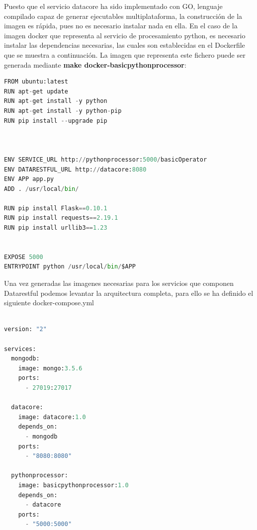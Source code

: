 \documentclass[a4paper,11pt]{book}
\begin{document}
Puesto que el servicio datacore ha sido implementado con GO, lenguaje compilado capaz de generar ejecutables multiplataforma, la construcción de la imagen es rápida, pues no es necesario instalar nada en ella. En el caso de la imagen docker que representa al servicio de procesamiento python, es necesario instalar las dependencias  necesarias, las cuales son establecidas en el Dockerfile que se muestra a continuación. La imagen que representa este fichero puede ser generada mediante \textbf{make docker-basicpythonprocessor}:

\begin{lstlisting}[language=python,caption={basicPythonProcessor/Dockerfile}]
FROM ubuntu:latest
RUN apt-get update
RUN apt-get install -y python
RUN apt-get install -y python-pip
RUN pip install --upgrade pip



ENV SERVICE_URL http://pythonprocessor:5000/basicOperator
ENV DATARESTFUL_URL http://datacore:8080
ENV APP app.py
ADD . /usr/local/bin/

RUN pip install Flask==0.10.1
RUN pip install requests==2.19.1
RUN pip install urllib3==1.23


EXPOSE 5000
ENTRYPOINT python /usr/local/bin/$APP

\end{lstlisting}

Una vez generadas las imagenes necesarias para los servicios que componen Datarestful podemos levantar la arquitectura completa, para ello se ha definido el siguiente docker-compose.yml


\begin{lstlisting}[language=python,caption={docker-compose.yml}]

version: "2"

services:
  mongodb:
    image: mongo:3.5.6
    ports:
      - 27019:27017

  datacore:
    image: datacore:1.0
    depends_on:
      - mongodb
    ports:
      - "8080:8080"

  pythonprocessor:
    image: basicpythonprocessor:1.0
    depends_on:
      - datacore
    ports:
      - "5000:5000"
\end{lstlisting}
\end{document}
